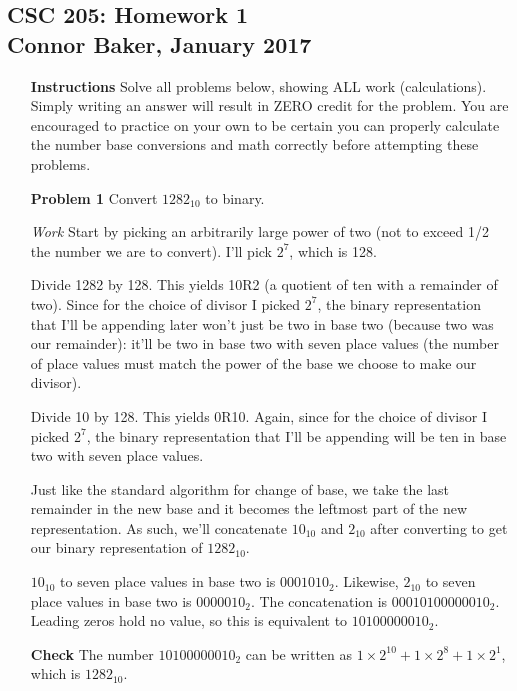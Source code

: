 \documentclass[12pt]{article}
\begin{document}
\begin{center}
  \subsection*{CSC 205: Homework 1\\Connor Baker, January 2017}
\end{center}
\begin{enumerate}
  \item[\textbf{Instructions}] Solve all problems below, showing ALL work (calculations). Simply writing an answer will result in ZERO credit for the problem. You are encouraged to practice on your own to be certain you can properly calculate the number base conversions and math correctly before attempting these problems.
\end{enumerate}

\begin{enumerate}
  \item[\textbf{Problem 1}] Convert $1282_{10}$ to binary.
\end{enumerate}

\begin{enumerate}
  \item[\textit{Work}] Start by picking an arbitrarily large power of two (not to exceed 1/2 the number we are to convert). I'll pick $2^7$, which is 128.
  \item[] Divide 1282 by 128. This yields 10R2 (a quotient of ten with a remainder of two). Since for the choice of divisor I picked $2^7$, the binary representation that I'll be appending later won't just be two in base two (because two was our remainder): it'll be two in base two with seven place values (the number of place values must match the power of the base we choose to make our divisor).
  \item[] Divide 10 by 128. This yields 0R10. Again, since for the choice of divisor I picked $2^7$, the binary representation that I'll be appending  will be ten in base two with seven place values.
  \item[] Just like the standard algorithm for change of base, we take the last remainder in the new base and it becomes the leftmost part of the new representation. As such, we'll concatenate $10_10$ and $2_10$ after converting to get our binary representation of $1282_{10}$.
  \item[] $10_{10}$ to seven place values in base two is $0001010_2$. Likewise, $2_{10}$ to seven place values in base two is $0000010_2$. The concatenation is $00010100000010_2$. Leading zeros hold no value, so this is equivalent to $10100000010_2$.
  \item[\textbf{Check}] The number $10100000010_2$ can be written as $1\times2^{10}+1\times2^8+1\times2^1$, which is $1282_{10}$.
\end{enumerate}
\end{document}
